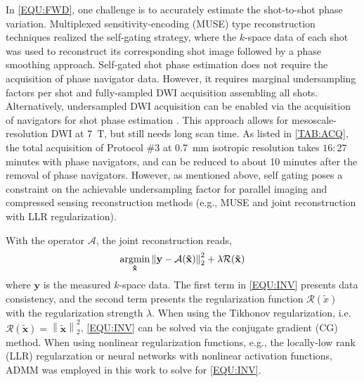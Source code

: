 \documentclass[journal,twoside,web]{ieeecolor}
\newcommand{\argmin}{\operatornamewithlimits{argmin}}
\newcommand{\norm}[1]{\left\lVert#1\right\rVert}
\begin{document}
	In \cref{EQU:FWD}, one challenge is
	to accurately estimate the shot-to-shot phase variation.
	Multiplexed sensitivity-encoding (MUSE) type reconstruction techniques
	\cite{liu_2004_diff_spiral,uecker_2009_nlinv_diff,chen_2013_muse,merrem_2019_nl_steam}
	realized the self-gating strategy,
	where the $k$-space data of each shot was used to reconstruct
	its corresponding shot image followed by a phase smoothing approach.
	Self-gated shot phase estimation does not require
	the acquisition of phase navigator data.
	However, it requires marginal undersampling factors per shot and
	fully-sampled DWI acquisition assembling all shots.
	Alternatively, undersampled DWI acquisition can be enabled
	via the acquisition of navigators for shot phase estimation
	\cite{tan_2024_naviepi}.
	This approach allows for mesoscale-resolution DWI at \SI{7}{\tesla},
	but still needs long scan time.
	As listed in \cref{TAB:ACQ}, the total acquisition of
	Protocol \#3 at \SI{0.7}{mm} isotropic resolution
	takes $16:27$ minutes with phase navigators,
	and can be reduced to about 10 minutes after the removal of phase navigators.
	However, as mentioned above, self gating poses a constraint
	on the achievable undersampling factor
	for parallel imaging and compressed sensing reconstruction methods
	(e.g., MUSE and joint reconstruction with LLR regularization).

	With the operator $\mathcal{A}$, the joint reconstruction reads,
	\begin{equation}
		\argmin_{\mathbf{\tilde{x}}} \norm{\mathbf{y} - \mathcal{A}(\mathbf{\tilde{x}})}_2^2 + \lambda \mathcal{R}(\mathbf{\tilde{x}})
		\label{EQU:INV}
	\end{equation}
	where $\mathbf{y}$ is the measured $k$-space data.
	The first term in \cref{EQU:INV} presents data consistency, and
	the second term presents the regularization function $\mathcal{R}(\tilde{x})$
	with the regularization strength $\lambda$.
	When using the Tikhonov regularization,
	i.e.~$\mathcal{R}(\mathbf{\tilde{x}}) = \norm{\mathbf{\tilde{x}}}_2^2$,
	\cref{EQU:INV} can be solved via the conjugate gradient (CG) method.
	When using nonlinear regularization functions,
	e.g., the locally-low rank (LLR) regularzation \cite{tan_2024_naviepi} or
	neural networks with nonlinear activation functions,
	ADMM was employed in this work to solve for \cref{EQU:INV}.
\end{document}
